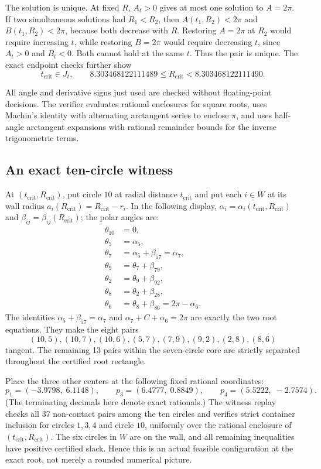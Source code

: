 \documentclass[11pt,a4paper]{article}
\theoremstyle{remark}
\newcommand{\Rcrit}{R_{\mathrm{crit}}}
\begin{document}
The solution is unique.  At fixed $R$, $A_t>0$ gives at most one solution
to $A=2\pi$.  If two simultaneous solutions had $R_1<R_2$, then
$A(t_1,R_2)<2\pi$ and $B(t_1,R_2)<2\pi$, because both decrease with $R$.
Restoring $A=2\pi$ at $R_2$ would require increasing $t$, while restoring
$B=2\pi$ would require decreasing $t$, since $A_t>0$ and $B_t<0$.  Both
cannot hold at the same $t$.  Thus the pair is unique.  The exact endpoint
checks further show
\[
  t_{\mathrm{crit}}\in J_t,\qquad
  8.303468122111489\le \Rcrit<8.303468122111490.
\]

All angle and derivative signs just used are checked without floating-point
decisions.  The verifier evaluates rational enclosures for square roots,
uses Machin's identity with alternating arctangent series to enclose $\pi$,
and uses half-angle arctangent expansions with rational remainder bounds for
the inverse trigonometric terms.

\subsection{An exact ten-circle witness}
\label{sec:witness}

At $(t_{\mathrm{crit}},\Rcrit)$, put circle $10$ at radial distance
$t_{\mathrm{crit}}$ and put each $i\in W$ at its wall radius
$a_i(\Rcrit)=\Rcrit-r_i$.  In the following display,
$\alpha_i=\alpha_i(t_{\mathrm{crit}},\Rcrit)$ and
$\beta_{ij}=\beta_{ij}(\Rcrit)$; the polar angles are:
\begin{align*}
 \theta_{10}&=0,\\
 \theta_5&=\alpha_5,\\
 \theta_7&=\alpha_5+\beta_{57}=\alpha_7,\\
 \theta_9&=\theta_7+\beta_{79},\\
 \theta_2&=\theta_9+\beta_{92},\\
 \theta_8&=\theta_2+\beta_{28},\\
 \theta_6&=\theta_8+\beta_{86}=2\pi-\alpha_6.
\end{align*}
The identities $\alpha_5+\beta_{57}=\alpha_7$ and
$\alpha_7+C+\alpha_6=2\pi$ are exactly the two root equations.  They make
the eight pairs
\[
 (10,5),(10,7),(10,6),(5,7),(7,9),(9,2),(2,8),(8,6)
\]
tangent.  The remaining 13 pairs within the seven-circle core are
strictly separated throughout the certified root rectangle.

Place the three other centers at the following fixed rational coordinates:
\[
 p_1=(-3.9798,\;6.1148),\qquad
 p_3=(6.4777,\;0.8849),\qquad
 p_4=(5.5222,\;-2.7574).
\]
(The terminating decimals here denote exact rationals.)  The witness replay
checks all 37 non-contact pairs among the ten circles and verifies strict
container inclusion for circles $1,3,4$ and circle $10$, uniformly over the
rational enclosure of $(t_{\mathrm{crit}},\Rcrit)$.  The six circles in $W$
are on the wall, and all remaining inequalities have positive certified
slack.  Hence this is an actual feasible configuration at the exact root,
not merely a rounded numerical picture.
\end{document}
